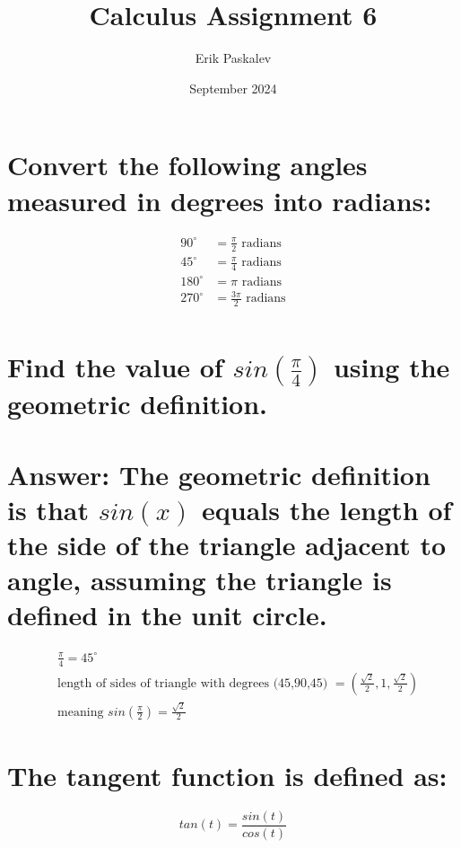 \documentclass{article}
\title{Calculus Assignment 6}
\author{Erik Paskalev}
\date{September 2024}
\begin{document}
\maketitle

\section{\normalfont Convert the following angles measured in degrees into radians: }

\begin{equation}
\begin{split}
{90}^{\circ} & = \frac{\pi}{2} \text{ radians} \\
{45}^{\circ} & = \frac{\pi}{4} \text{ radians} \\
{180}^{\circ} & = \pi \text{ radians} \\
{270}^{\circ} & = \frac{3\pi}{2} \text{ radians} \\
\end{split}
\end{equation}

\section{\normalfont Find the value of $sin(\frac{\pi}{4})$ using the geometric definition.}

\section*{Answer: The geometric definition is that $sin(x)$ equals the length of the side of the triangle adjacent to angle, assuming the triangle is defined in the unit circle.}
\begin{equation}
\begin{split}
& \frac{\pi}{4} = {45}^{\circ} \\
& \text{length of sides of triangle with degrees (45,90,45) } = (\frac{\sqrt{2}}{2}, 1, \frac{\sqrt{2}}{2}) \\ 
& \text{meaning } sin(\frac{\pi}{2}) = \frac{\sqrt{2}}{2} 
\end{split}
\end{equation}

\section{\normalfont The tangent function is defined as:}

\begin{equation}
tan(t) = \frac{sin(t)}{cos(t)}
\end{equation}
\end{document}
